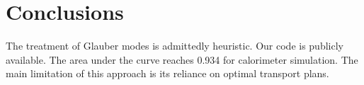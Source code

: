 \section{Conclusions}\label{sec:conclusions}

The treatment of Glauber modes is admittedly heuristic. Our code is
publicly available. The area under the curve reaches 0.934 for
calorimeter simulation. The main limitation of this approach is its
reliance on optimal transport plans.

